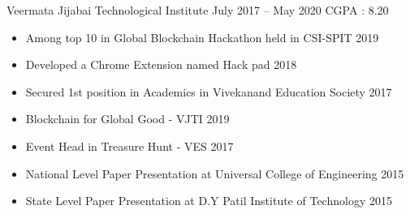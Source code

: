 

 {Veermata Jijabai Technological Institute}{ July 2017 -- May 2020 \hspace{1 cm} CGPA : 8.20}{}

\smallskip
{}

\smallskip
{}












\smallskip
\begin{itemize}

\item Among top 10 in Global Blockchain Hackathon held in CSI-SPIT \hspace{0.7 cm} 2019

\smallskip
\item  Developed a Chrome Extension named Hack pad  \hspace{3.5 cm} 2018

\smallskip
\item Secured 1st position in Academics in Vivekanand Education Society \hspace{0.3 cm} 2017

\end{itemize}







\begin{itemize}
    \item Blockchain for Global Good - VJTI \hspace{0.25 cm} 2019
    
    \smallskip
    \item Event Head in Treasure Hunt - VES \hspace{0.1 cm} 2017
    
    \smallskip
    \item National Level Paper Presentation at Universal College of Engineering \hspace{0.4 cm} 2015
    
    \smallskip
    \item State Level Paper Presentation at D.Y Patil Institute of Technology \hspace{1.9 cm}   2015
\end{itemize}





